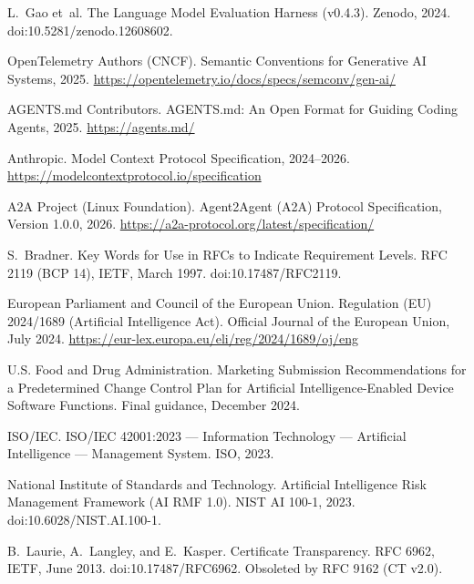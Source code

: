 L.~Gao et~al.
\newblock The Language Model Evaluation Harness (v0.4.3).
\newblock Zenodo, 2024. doi:10.5281/zenodo.12608602.

OpenTelemetry Authors (CNCF).
\newblock Semantic Conventions for Generative AI Systems, 2025.
\newblock \url{https://opentelemetry.io/docs/specs/semconv/gen-ai/}

AGENTS.md Contributors.
\newblock AGENTS.md: An Open Format for Guiding Coding Agents, 2025.
\newblock \url{https://agents.md/}

Anthropic.
\newblock Model Context Protocol Specification, 2024--2026.
\newblock \url{https://modelcontextprotocol.io/specification}

A2A Project (Linux Foundation).
\newblock Agent2Agent (A2A) Protocol Specification, Version 1.0.0, 2026.
\newblock \url{https://a2a-protocol.org/latest/specification/}

S.~Bradner.
\newblock Key Words for Use in RFCs to Indicate Requirement Levels.
\newblock RFC 2119 (BCP 14), IETF, March 1997. doi:10.17487/RFC2119.

European Parliament and Council of the European Union.
\newblock Regulation (EU) 2024/1689 (Artificial Intelligence Act).
\newblock Official Journal of the European Union, July 2024.
\newblock \url{https://eur-lex.europa.eu/eli/reg/2024/1689/oj/eng}

U.S. Food and Drug Administration.
\newblock Marketing Submission Recommendations for a Predetermined Change
Control Plan for Artificial Intelligence-Enabled Device Software Functions.
\newblock Final guidance, December 2024.

ISO/IEC.
\newblock ISO/IEC 42001:2023 --- Information Technology --- Artificial
Intelligence --- Management System.
\newblock ISO, 2023.

National Institute of Standards and Technology.
\newblock Artificial Intelligence Risk Management Framework (AI RMF 1.0).
\newblock NIST AI 100-1, 2023. doi:10.6028/NIST.AI.100-1.

B.~Laurie, A.~Langley, and E.~Kasper.
\newblock Certificate Transparency.
\newblock RFC 6962, IETF, June 2013. doi:10.17487/RFC6962.
\newblock Obsoleted by RFC 9162 (CT v2.0).

